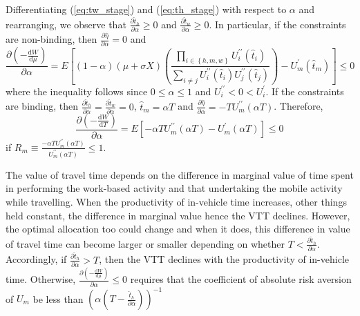 \documentclass[12pt,a4paper,british]{article}
\makeatletter
\newenvironment{proof}[1][\proofname]{\par
    \normalfont\topsep6\p@\@plus6\p@\relax
    \trivlist
    \itemindent\parindent
    \item[\hskip\labelsep
          \scshape
      #1]\ignorespaces
  }{%
    \endtrivlist\@endpefalse
  }
\providecommand{\proofname}{Proof}
\makeatother
\begin{document}
\begin{proof}
Differentiating (\ref{eq:tw_stage}) and (\ref{eq:th_stage}) with respect to $\alpha$ and rearranging, we observe that $\frac{\partial\hat{t}_{h}}{\partial\alpha} \geq 0$ and $\frac{\partial\hat{t}_{w}}{\partial\alpha}\geq0$. In particular, if the constraints are non-binding, then $\frac{\partial\hat{\eta}}{\partial\alpha}=0 $ and 
\begin{equation*}
\frac{\partial\left(-\frac{\mathrm{d}W}{\mathrm{d}\mu}\right)}{\partial\alpha} = E\left[\left(1-\alpha\right)  \left( \mu + \sigma X \right) \left(\frac{\prod_{i \in\left\{ h, m, w \right\}}U_{i}^{\prime\prime}\left(\hat{t}_{i}\right)}{\sum_{i\neq j}U_{i}^{\prime\prime}\left(\hat{t}_{i}\right)U_{j}^{\prime\prime}\left(\hat{t}_{j}\right)}\right)-U_{m}^{\prime}\left(\hat{t}_{m}\right)\right] \leq 0
\end{equation*}
where the inequality follows since $0\leq \alpha \leq 1$ and $U^{\prime\prime}_i < 0< U^{\prime}_i$.  If the constraints are binding, then $\frac{\partial\hat{t}_{h}}{\partial\alpha}=\frac{\partial\hat{t}_{w}}{\partial\alpha}=0$, $\hat{t}_{m}=\alpha T$ and $\frac{\partial\hat{\eta}}{\partial\alpha}=-TU_{m}^{\prime\prime}\left(\alpha T\right)$. Therefore,
\begin{equation*}
\frac{\partial\left(-\frac{\mathrm{d}W}{\mathrm{d}T}\right)}{\partial\alpha}= E\left[-\alpha TU_{m}^{\prime\prime}\left(\alpha T\right)-U_{m}^{\prime}\left(\alpha T\right)\right] \leq 0
\end{equation*}
if $R_m \equiv \frac{-\alpha T U_m^{\prime\prime} \left(\alpha T\right)}{U_m^{\prime\prime} \left(\alpha T\right)} \leq 1$. 
\end{proof}


The value of travel time depends on the difference in marginal value of time spent in performing the work-based activity and that undertaking the mobile activity while travelling. When the productivity of in-vehicle time increases, other things held constant, the difference in marginal value hence the VTT declines. However, the optimal allocation too could change and when it does, this difference in value of travel time can become larger or smaller depending on whether $T < \frac{\partial \hat{t}_h}{\partial \alpha}$. Accordingly, if $\frac{\partial \hat{t}_h}{\partial \alpha} > T$, then the VTT declines with the productivity of in-vehicle time. Otherwise, $\frac{\partial\left( -\frac{\mathrm{d}W }{\mathrm{d}\mu} \right)}{\partial\alpha} \leq 0$ requires that the coefficient of absolute risk aversion of $U_m$ be less than $\left( \alpha \left(T - \frac{\hat{t}_h}{\partial \alpha} \right) \right)^{-1}$
\end{document}

